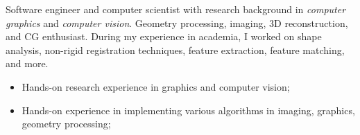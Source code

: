

\begin{cvparagraph}

Software engineer and computer scientist with research background in 
\textit{computer graphics} and \textit{computer vision}. Geometry processing, imaging, 3D
reconstruction, and CG enthusiast. During my experience in academia, I worked
on shape analysis, non-rigid registration techniques, feature extraction, feature matching, and more.
\begin{itemize}
	\item Hands-on research experience in graphics and computer vision;
	\item Hands-on experience in implementing various algorithms in imaging, graphics, geometry processing;
\end{itemize}
\end{cvparagraph}